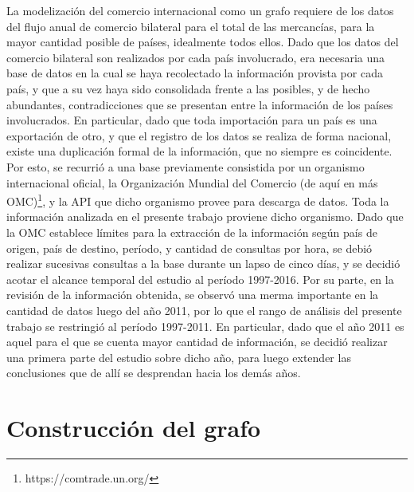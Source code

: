 \documentclass[runningheads,a4paper]{llncs}
\begin{document}
La modelización del comercio internacional como un grafo requiere de los datos del flujo anual de comercio bilateral para el total de las mercancías, para la mayor cantidad posible de países, idealmente todos ellos. Dado que los datos del comercio bilateral son realizados por cada país involucrado, era necesaria una base de datos en la cual se haya recolectado la información provista por cada país, y que a su vez haya sido consolidada frente a las posibles, y de hecho abundantes, contradicciones que se presentan entre la información de los países involucrados. En particular, dado que toda importación para un país es una exportación de otro, y que el registro de los datos se realiza de forma nacional, existe una duplicación formal de la información, que no siempre es coincidente. Por esto, se recurrió a una base previamente consistida por un organismo internacional oficial, la Organización Mundial del Comercio (de aquí en más OMC)\footnote{https://comtrade.un.org/}, y la API que dicho organismo provee para descarga de datos. Toda la información analizada en el presente trabajo proviene dicho organismo. 
Dado que la OMC establece límites para la extracción de la información según país de origen, país de destino, período, y cantidad de consultas por hora, se debió realizar sucesivas consultas a la base durante un lapso de cinco días, y se decidió acotar el alcance temporal del estudio al período 1997-2016. Por su parte, en la revisión de la información obtenida, se observó una merma importante en la cantidad de datos luego del año 2011, por lo que el rango de análisis del presente trabajo se restringió al período 1997-2011. En particular, dado que el año 2011 es aquel para el que se cuenta mayor cantidad de información, se decidió realizar una primera parte del estudio sobre dicho año, para luego extender las conclusiones que de allí se desprendan hacia los demás años.

\section{Construcción del grafo}
\end{document}

